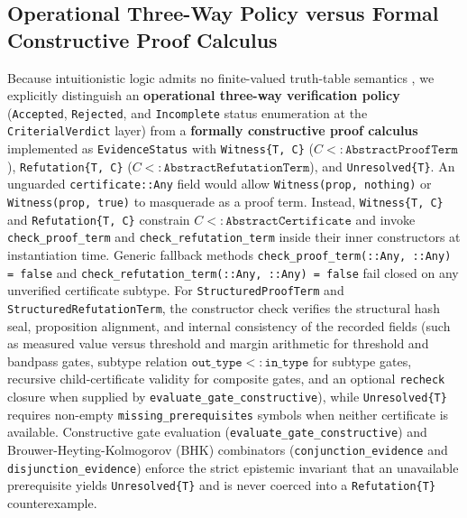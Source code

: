 \subsection{Operational Three-Way Policy versus Formal Constructive Proof Calculus}
\sloppy
Because intuitionistic logic admits no finite-valued truth-table semantics \cite{godel1932intuitionistischen}, we explicitly distinguish an \textbf{operational three-way verification policy} (\texttt{Accepted}, \texttt{Rejected}, and \texttt{Incomplete} status enumeration at the \texttt{CriterialVerdict} layer) from a \textbf{formally constructive proof calculus} implemented as \texttt{EvidenceStatus} with \texttt{Witness\{T, C\}} ($C <: \texttt{AbstractProofTerm}$), \texttt{Refutation\{T, C\}} ($C <: \texttt{AbstractRefutationTerm}$), and \texttt{Unresolved\{T\}}. An unguarded \texttt{certificate::Any} field would allow \texttt{Witness(prop, nothing)} or \texttt{Witness(prop, true)} to masquerade as a proof term. Instead, \texttt{Witness\{T, C\}} and \texttt{Refutation\{T, C\}} constrain $C <: \texttt{AbstractCertificate}$ and invoke \texttt{check\_proof\_term} and \texttt{check\_refutation\_term} inside their inner constructors at instantiation time. Generic fallback methods \texttt{check\_proof\_term(::Any, ::Any) = false} and \texttt{check\_refutation\_term(::Any, ::Any) = false} fail closed on any unverified certificate subtype. For \texttt{StructuredProofTerm} and \texttt{StructuredRefutationTerm}, the constructor check verifies the structural hash seal, proposition alignment, and internal consistency of the recorded fields (such as measured value versus threshold and margin arithmetic for threshold and bandpass gates, subtype relation $\texttt{out\_type} <: \texttt{in\_type}$ for subtype gates, recursive child-certificate validity for composite gates, and an optional \texttt{recheck} closure when supplied by \texttt{evaluate\_gate\_constructive}), while \texttt{Unresolved\{T\}} requires non-empty \texttt{missing\_prerequisites} symbols when neither certificate is available. Constructive gate evaluation (\texttt{evaluate\_gate\_constructive}) and Brouwer-Heyting-Kolmogorov (BHK) combinators (\texttt{conjunction\_evidence} and \texttt{disjunction\_evidence}) enforce the strict epistemic invariant that an unavailable prerequisite yields \texttt{Unresolved\{T\}} and is never coerced into a \texttt{Refutation\{T\}} counterexample.

